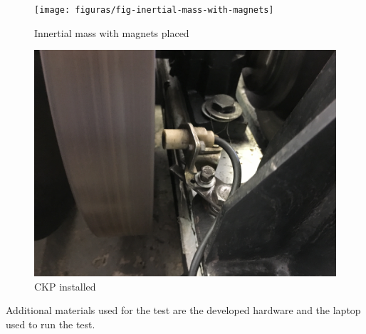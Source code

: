 		\begin{figure}[htbp]
			\centering
			\texttt{[image: figuras/fig-inertial-mass-with-magnets]}
			\caption{Innertial mass with magnets placed}
			\label{fig:inertial-mass-with-magnets}
		\end{figure}

		\begin{figure}[htbp]
			\centering
			\includegraphics[scale=0.7]{figuras/fig-ckp-installed}
			\caption{CKP installed}
			\label{fig:ckp-installed}
		\end{figure}
		\par

		Additional materials used for the test are the developed hardware and the laptop used to run the test.